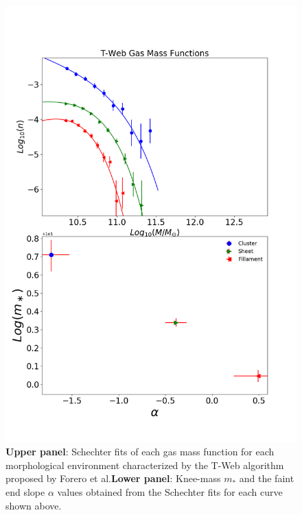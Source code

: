 \documentclass[a4paper,fleqn,usenatbib]{mnras}
\begin{document}
\begin{figure}
	\includegraphics[width=\columnwidth]{./pics/F19_T-Web_Gas.png}
    \caption{\textbf{Upper panel}: Schechter fits of each gas mass
      function for each morphological environment characterized by the
      T-Web algorithm proposed by Forero et al.\textbf{Lower panel}:
      Knee-mass $m_\ast$ and the faint end slope $\alpha$ values
      obtained from the Schechter fits for each curve shown above.} 
    \label{fig:TwebGas}
\end{figure}
\end{document}
